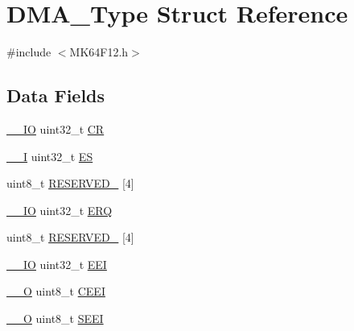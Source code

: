 \hypertarget{struct_d_m_a___type}{}\section{D\+M\+A\+\_\+\+Type Struct Reference}
\label{struct_d_m_a___type}


{\ttfamily \#include $<$M\+K64\+F12.\+h$>$}

\subsection*{Data Fields}
\begin{DoxyCompactItemize}
\item 
\mbox{\hyperlink{core__cm4_8h_aec43007d9998a0a0e01faede4133d6be}{\+\_\+\+\_\+\+IO}} uint32\+\_\+t \mbox{\hyperlink{group___v_r_e_f___peripheral___access___layer_gab40c89c59391aaa9d9a8ec011dd0907a}{CR}}
\item 
\mbox{\hyperlink{core__cm4_8h_af63697ed9952cc71e1225efe205f6cd3}{\+\_\+\+\_\+I}} uint32\+\_\+t \mbox{\hyperlink{group___v_r_e_f___peripheral___access___layer_ga80b8bfa41d30c891884904851a949a12}{ES}}
\item 
uint8\+\_\+t \mbox{\hyperlink{group___v_r_e_f___peripheral___access___layer_ga71277aaa40be4473ac2521981f273bd3}{R\+E\+S\+E\+R\+V\+E\+D\+\_}} \mbox{[}4\mbox{]}
\item 
\mbox{\hyperlink{core__cm4_8h_aec43007d9998a0a0e01faede4133d6be}{\+\_\+\+\_\+\+IO}} uint32\+\_\+t \mbox{\hyperlink{group___v_r_e_f___peripheral___access___layer_ga2113e9581c43022c6c940eea384f49f7}{E\+RQ}}
\item 
uint8\+\_\+t \mbox{\hyperlink{group___v_r_e_f___peripheral___access___layer_ga422ac2beba1cc5c797380d1c5832b885}{R\+E\+S\+E\+R\+V\+E\+D\+\_}} \mbox{[}4\mbox{]}
\item 
\mbox{\hyperlink{core__cm4_8h_aec43007d9998a0a0e01faede4133d6be}{\+\_\+\+\_\+\+IO}} uint32\+\_\+t \mbox{\hyperlink{group___v_r_e_f___peripheral___access___layer_ga12046d2ab6e0818c9c11b4e96d66a2e0}{E\+EI}}
\item 
\mbox{\hyperlink{core__cm4_8h_a7e25d9380f9ef903923964322e71f2f6}{\+\_\+\+\_\+O}} uint8\+\_\+t \mbox{\hyperlink{group___v_r_e_f___peripheral___access___layer_gaf8cbb6695cfc2845b17aa66c639d9bdc}{C\+E\+EI}}
\item 
\mbox{\hyperlink{core__cm4_8h_a7e25d9380f9ef903923964322e71f2f6}{\+\_\+\+\_\+O}} uint8\+\_\+t \mbox{\hyperlink{group___v_r_e_f___peripheral___access___layer_ga31235a08f568be7aa41963234a9d676c}{S\+E\+EI}}

\end{DoxyCompactItemize}
